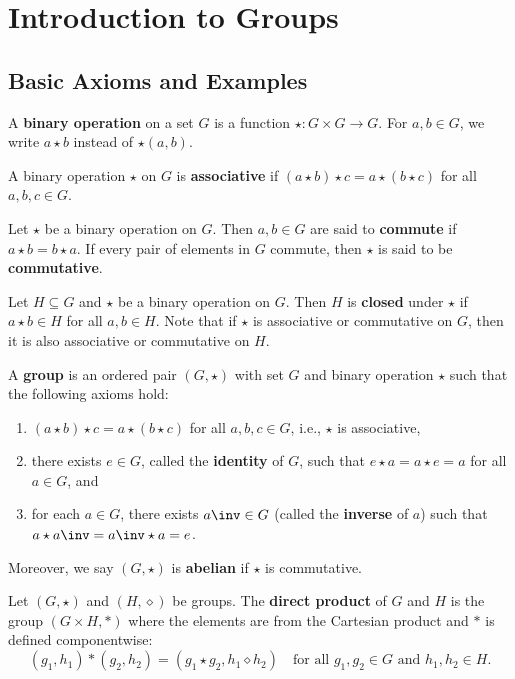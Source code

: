 \section{Introduction to Groups}

\subsection{Basic Axioms and Examples} \label{sec1.1}

 A \textbf{binary operation} on a set $G$ is a function $\star : G \times G \to G$. For $a, b \in G$, we write $a \star b$ instead of $\star(a, b)$.

 A binary operation $\star$ on $G$ is \textbf{associative} if $(a \star b) \star c = a \star (b \star c)$ for all $a, b, c \in G$.

 Let $\star$ be a binary operation on $G$. Then $a, b \in G$ are said to \textbf{commute} if $a \star b = b \star a$. If every pair of elements in $G$ commute, then $\star$ is said to be \textbf{commutative}.

 Let $H \subseteq G$ and $\star$ be a binary operation on $G$. Then $H$ is \textbf{closed} under $\star$ if $a \star b \in H$ for all $a, b \in H$. Note that if $\star$ is associative or commutative on $G$, then it is also associative or commutative on $H$.

 A \textbf{group} is an ordered pair $(G, \star)$ with set $G$ and binary operation $\star$ such that the following axioms hold:
\begin{enumerate}
    \item $(a \star b) \star c = a \star (b \star c)$ for all $a, b, c \in G$, i.e., $\star$ is associative,
    \item there exists $e \in G$, called the \textbf{identity} of $G$, such that $e \star a = a \star e = a$ for all $a \in G$, and
    \item for each $a \in G$, there exists $a\inv \in G$ (called the \textbf{inverse} of $a$) such that $a \star a\inv = a\inv \star a = e$.
\end{enumerate}
Moreover, we say $(G, \star)$ is \textbf{abelian} if $\star$ is commutative.

 Let $(G, \star)$ and $(H, \diamond)$ be groups. The \textbf{direct product} of $G$ and $H$ is the group $(G \times H, *)$ where the elements are from the Cartesian product and $*$ is defined componentwise:
\[(g_1, h_1) * (g_2, h_2) = (g_1 \star g_2, h_1 \diamond h_2) \quad \text{for all } g_1, g_2 \in G \text{ and } h_1, h_2 \in H.\]

